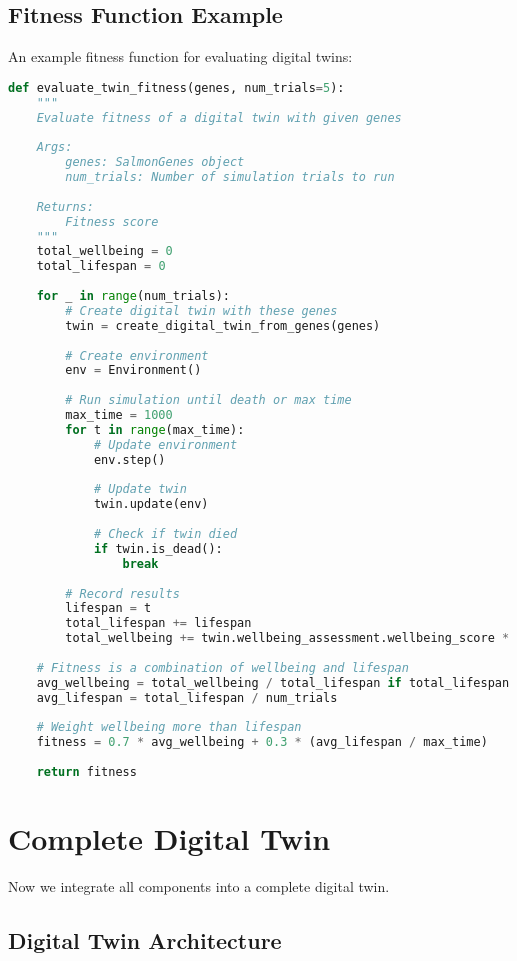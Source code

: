 \documentclass[11pt,a4paper]{article}
\begin{document}
\subsection{Fitness Function Example}
An example fitness function for evaluating digital twins:

\begin{lstlisting}[language=Python]
def evaluate_twin_fitness(genes, num_trials=5):
    """
    Evaluate fitness of a digital twin with given genes
    
    Args:
        genes: SalmonGenes object
        num_trials: Number of simulation trials to run
        
    Returns:
        Fitness score
    """
    total_wellbeing = 0
    total_lifespan = 0
    
    for _ in range(num_trials):
        # Create digital twin with these genes
        twin = create_digital_twin_from_genes(genes)
        
        # Create environment
        env = Environment()
        
        # Run simulation until death or max time
        max_time = 1000
        for t in range(max_time):
            # Update environment
            env.step()
            
            # Update twin
            twin.update(env)
            
            # Check if twin died
            if twin.is_dead():
                break
                
        # Record results
        lifespan = t
        total_lifespan += lifespan
        total_wellbeing += twin.wellbeing_assessment.wellbeing_score * lifespan
        
    # Fitness is a combination of wellbeing and lifespan
    avg_wellbeing = total_wellbeing / total_lifespan if total_lifespan > 0 else 0
    avg_lifespan = total_lifespan / num_trials
    
    # Weight wellbeing more than lifespan
    fitness = 0.7 * avg_wellbeing + 0.3 * (avg_lifespan / max_time)
    
    return fitness
\end{lstlisting}

\section{Complete Digital Twin}
Now we integrate all components into a complete digital twin.

\subsection{Digital Twin Architecture}
\end{document}
